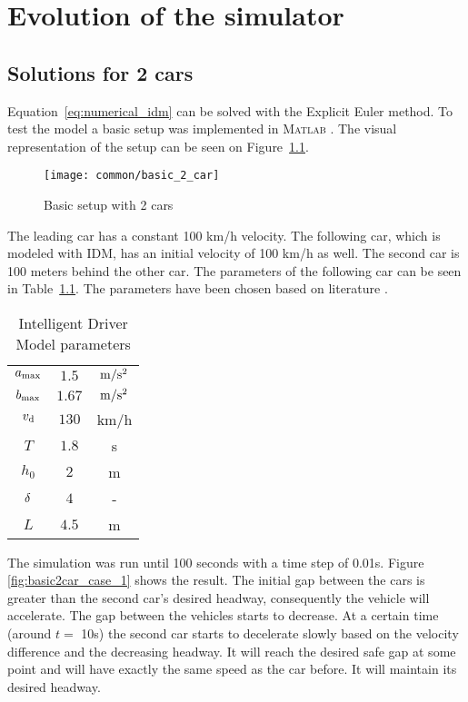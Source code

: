 \chapter{Evolution of the simulator}
	\section{Solutions for 2 cars}\label{sec:base2car}
		Equation~\eqref{eq:numerical_idm} can be solved with the Explicit Euler method. To test the model a basic setup was implemented in \textsc{Matlab} \cite{matlab}. The visual representation of the setup can be seen on Figure~\ref{fig:basic2car}.
		\begin{figure}
			\centering
			\texttt{[image: common/basic\_2\_car]}
			\caption{Basic setup with 2 cars}
			\label{fig:basic2car}
		\end{figure}
		The leading car has a constant 100 km/h velocity. The following car, which is modeled with IDM, has an initial velocity of 100 km/h as well. The second car is 100 meters behind the other car. The parameters of the following car can be seen in Table~\ref{tab:idm_params}. The parameters have been chosen based on literature \cite{opensource}.
		\begin{table}
			\begin{center}
				\begin{tabular}{ |c|c|c| }
					\hline
					$a_{\rm max}$ & $1.5$ & $\rm m/s^2$ \\
					$b_{\rm max}$ & $1.67$ & $\rm m/s^2$ \\
					$v_{\rm d}$ & $130$ & km/h \\
					$T$ & $1.8$ & s \\
					$h_0$ & $2$ & m \\
					$\rm \delta$ & $4$ & - \\
					$L$ & $4.5$ & m \\
					\hline
				\end{tabular}
			\end{center}
			\caption{Intelligent Driver Model parameters}
			\label{tab:idm_params}
		\end{table}
		The simulation was run until 100 seconds with a time step of 0.01s. Figure \ref{fig:basic2car_case_1} shows the result. The initial gap between the cars is greater than the second car's desired headway, consequently the vehicle will accelerate. The gap between the vehicles starts to decrease. At a certain time (around $t =$ 10s) the second car starts to decelerate slowly based on the velocity difference and the decreasing headway. It will reach the desired safe gap at some point and will have exactly the same speed as the car before. It will maintain its desired headway.
